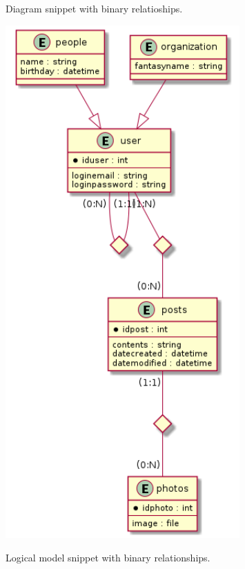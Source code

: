 \begin{figure}[!htb]
  \centering
  \begin{minipage}[b]{0.4\textwidth}
    \caption{Diagram snippet with binary relatioships.}
    \includegraphics[width=0.8\textwidth]{img/Diagram_binary.png}
    \label{fig:Diagram_Binary}
  \end{minipage}
  \hfill
  \begin{minipage}[b]{0.5\textwidth}
    \caption{Logical model snippet with binary relationships.}
    \label{fig:Logical_Binary}

\end{minipage}
\end{figure}
